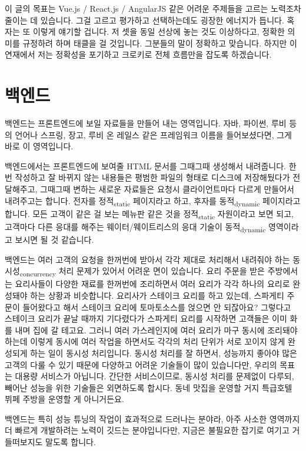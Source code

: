 \documentclass[11pt,a4paper]{article}
\begin{document}
이 글의 목표는 \textsf{Vue.js / React.js / AngularJS} 같은 어려운 주제들을 고르는 노력조차 줄이는 데 있습니다. 그걸 고르고 평가하고 선택하는데도 굉장한 에너지가 듭니다. 혹자는 또 이렇게 얘기할 겁니다. 저 셋을 동일 선상에 놓는 것도 이상하다고, 정확한 의미를 규정하려 하며 태클을 걸 것입니다. 그분들의 말이 정확하고 맞습니다. 하지만 이 연재에서 저는 정확성을 포기하고 크로키로 전체 흐름만을 잡도록 하겠습니다.

\section{백엔드}

백엔드는 프론트엔드에 보일 자료들을 만들어 내는 영역입니다. 자바, 파이썬, 루비 등의 언어나 스프링, 장고, 루비 온 레일스 같은 프레임워크 이름을 들어보셨다면, 그게 바로 이 영역입니다.

백엔드에서는 프론트엔드에 보여줄 HTML 문서를 그때그때 생성해서 내려줍니다. 한번 작성하고 잘 바뀌지 않는 내용들은 평범한 파일의 형태로 디스크에 저장해뒀다가 전달해주고, 그때그때 변하는 새로운 자료들은 요청시 클라이언트마다 다르게 만들어서 내려주고는 합니다. 전자를 정적\textsubscript{static} 페이지라고 하고, 후자를 동적\textsubscript{dynamic} 페이지라고 합니다. 모든 고객이 같은 걸 보는 메뉴판 같은 것을 정적\textsubscript{static} 자원이라고 보면 되고, 고객마다 다른 응대를 해주는 웨이터/웨이트리스의 응대 기술이 동적\textsubscript{dynamic} 영역이라고 보시면 될 것 같습니다.

백엔드는 여러 고객의 요청을 한꺼번에 받아서 각각 제대로 처리해서 내려줘야 하는 동시성\textsubscript{concurrency} 처리 문제가 있어서 어려운 면이 있습니다. 요리 주문을 받은 주방에서는 요리사들이 다양한 재료를 한꺼번에 조리하면서 여러 요리가 각각 하나의 요리로 완성돼야 하는 상황과 비슷합니다. 요리사가 스테이크 요리를 하고 있는데, 스파게티 주문이 들어왔다고 해서 스테이크 요리에 토마토소스를 얹으면 안 되잖아요? 그렇다고 스테이크 요리가 끝날 때까지 기다렸다가 스파게티 요리를 시작하면 고객들은 이미 화를 내며 집에 갈 테고요. 그러니 여러 가스레인지에 여러 요리가 마구 동시에 조리돼야 하는데 이렇게 동시에 여러 작업을 하면서도 각각의 처리 단위가 서로 꼬이지 않게 완성되게 하는 일이 동시성 처리입니다. 동시성 처리를 잘 하면서, 성능까지 좋아야 많은 고객의 다룰 수 있기 때문에 다양하고 어려운 기술들이 많이 있습니다만, 우리의 목표는 대용량 서비스가 아닙니다. 간단한 서비스이므로, 동시성 처리를 문제없이 다루되, 빼어난 성능을 위한 기술들은 외면하도록 합시다. 동네 맛집을 운영할 거지 특급호텔 뷔페 주방을 운영할 게 아니거든요.

백엔드는 특히 성능 튜닝의 작업이 효과적으로 드러나는 분야라, 아주 사소한 영역까지 더 빠르게 개발하려는 노력이 깃드는 분야입니다만, 지금은 불필요한 잡기로 여기고 거들떠보지도 말도록 합니다.
\end{document}
